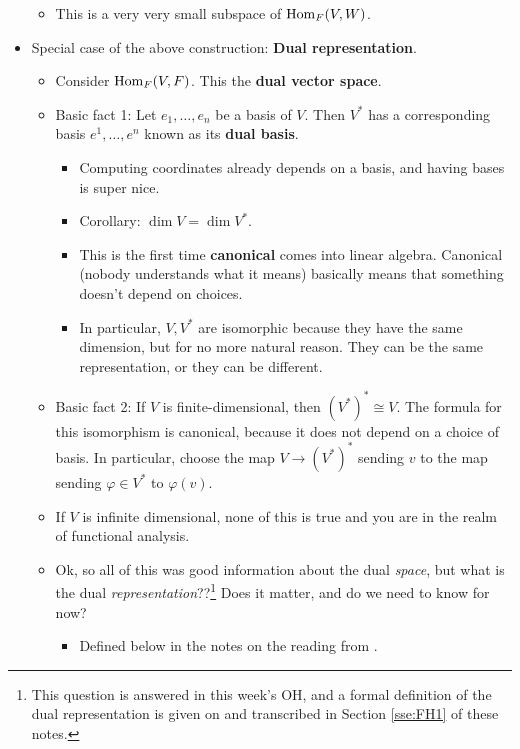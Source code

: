 \documentclass[../notes.tex]{subfiles}
\begin{document}
\begin{itemize}
    \begin{itemize}
        \item This is a very very small subspace of $\operatorname{Hom}_F(V,W)$.
    \end{itemize}
    \item Special case of the above construction: \textbf{Dual representation}.
    \begin{itemize}
        \item Consider $\operatorname{Hom}_F(V,F)$. This the \textbf{dual vector space}.
        \item Basic fact 1: Let $e_1,\dots,e_n$ be a basis of $V$. Then $V^*$ has a corresponding basis $e^1,\dots,e^n$ known as its \textbf{dual basis}.
        \begin{itemize}
            \item Computing coordinates already depends on a basis, and having bases is super nice.
            \item Corollary: $\dim V=\dim V^*$.
            \item This is the first time \textbf{canonical} comes into linear algebra. Canonical (nobody understands what it means) basically means that something doesn't depend on choices.
            \item In particular, $V,V^*$ are isomorphic because they have the same dimension, but for no more natural reason. They can be the same representation, or they can be different.
        \end{itemize}
        \item Basic fact 2: If $V$ is finite-dimensional, then $(V^*)^*\cong V$. The formula for this isomorphism is canonical, because it does not depend on a choice of basis. In particular, choose the map $V\to(V^*)^*$ sending $v$ to the map sending $\varphi\in V^*$ to $\varphi(v)$.
        \item If $V$ is infinite dimensional, none of this is true and you are in the realm of functional analysis.
        \item Ok, so all of this was good information about the dual \emph{space}, but what is the dual \emph{representation}??\footnote{This question is answered in this week's OH, and a formal definition of the dual representation is given on \textcite[4]{bib:FultonHarris} and transcribed in Section \ref{sse:FH1} of these notes.} Does it matter, and do we need to know for now?
        \begin{itemize}
            \item Defined below in the notes on the reading from \textcite{bib:FultonHarris}.

\end{itemize}
\end{itemize}
\end{itemize}
\end{document}
